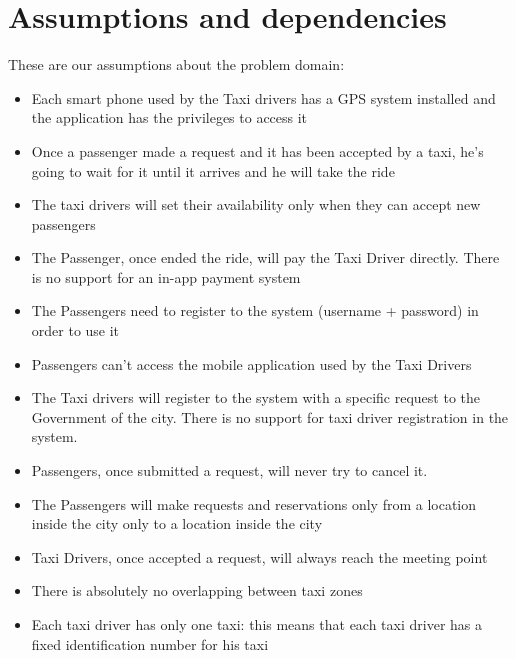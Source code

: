 \section{Assumptions and dependencies}
These are our assumptions about the problem domain:
\begin{itemize}
\item Each smart phone used by the Taxi drivers has a GPS system installed and the application has the privileges to access  it
\item Once a passenger made a request and it has been accepted by a taxi, he's going to wait for it until it arrives and he will take the ride
\item The taxi drivers will set their availability only when they can accept new passengers
\item The Passenger, once ended the ride, will pay the Taxi Driver directly. There is no support for an in-app payment system
\item The Passengers need to register to the system (username + password) in order to use it
\item Passengers can't access the mobile application used by the Taxi Drivers
\item The Taxi drivers will register to the system with a specific request to the Government of the city. There is no support for taxi driver registration in the system.
\item Passengers, once submitted a request, will never try to cancel it.
\item The Passengers will make requests and reservations only from a location inside the city only to a location inside the city
\item Taxi Drivers, once accepted a request, will always reach the meeting point
\item There is absolutely no overlapping between taxi zones
\item Each taxi driver has only one taxi: this means that each taxi driver has a fixed identification number for his taxi 
\end{itemize}

